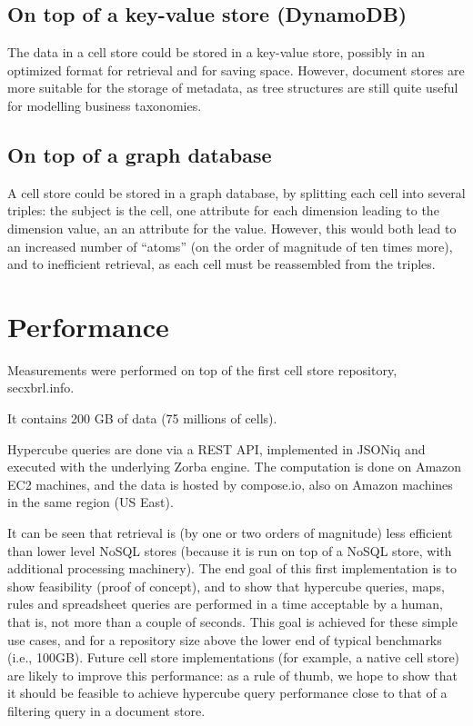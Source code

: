 \documentclass{acm_proc_article-sp}
\begin{document}
\subsection{On top of a key-value store (DynamoDB)}

The data in a cell store could be stored in a key-value store, possibly in an optimized format for retrieval and for saving space. However, document stores are more suitable for the storage of metadata, as tree structures are still quite useful for modelling business taxonomies.

\subsection{On top of a graph database}

A cell store could be stored in a graph database, by splitting each cell into several triples: the subject is the cell, one attribute for each dimension leading to the dimension value, an an attribute for the value. However, this would both lead to an increased number of ``atoms'' (on the order of magnitude of ten times more), and to inefficient retrieval, as each cell must be reassembled from the triples.

\section{Performance}
\label{section-performance}
Measurements were performed on top of the first cell store repository, secxbrl.info.

It contains 200 GB of data (75 millions of cells).

Hypercube queries are done via a REST API, implemented in JSONiq and executed with the underlying Zorba engine. The computation is done on Amazon EC2 machines, and the data is hosted by compose.io, also on Amazon machines in the same region (US East).

It can be seen that retrieval is (by one or two orders of magnitude) less efficient than lower level NoSQL stores (because it is run on top of a NoSQL store, with additional processing machinery). The end goal of this first implementation is to show feasibility (proof of concept), and to show that hypercube queries, maps, rules and spreadsheet queries are performed in a time acceptable by a human, that is, not more than a couple of seconds. This goal is achieved for these simple use cases, and for a repository size above the lower end of typical benchmarks (i.e., 100GB). Future cell store implementations (for example, a native cell store) are likely to improve this performance: as a rule of thumb, we hope to show that it should be feasible to achieve hypercube query performance close to that of a filtering query in a document store.
\end{document}
